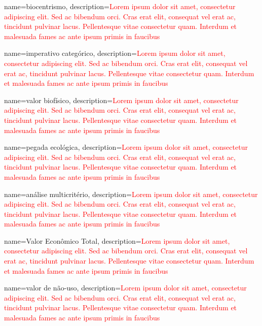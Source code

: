 {
	name=biocentrismo,
	description={\textcolor{red}{Lorem ipsum dolor sit amet, consectetur adipiscing elit. Sed ac bibendum orci. Cras erat elit, consequat vel erat ac, tincidunt pulvinar lacus. Pellentesque vitae consectetur quam. Interdum et malesuada fames ac ante ipsum primis in faucibus}}
}

{
	name=imperativo categórico,
	description={\textcolor{red}{Lorem ipsum dolor sit amet, consectetur adipiscing elit. Sed ac bibendum orci. Cras erat elit, consequat vel erat ac, tincidunt pulvinar lacus. Pellentesque vitae consectetur quam. Interdum et malesuada fames ac ante ipsum primis in faucibus}}
}

{
	name=valor biofísico,
	description={\textcolor{red}{Lorem ipsum dolor sit amet, consectetur adipiscing elit. Sed ac bibendum orci. Cras erat elit, consequat vel erat ac, tincidunt pulvinar lacus. Pellentesque vitae consectetur quam. Interdum et malesuada fames ac ante ipsum primis in faucibus}}
}

{
	name=pegada ecológica,
	description={\textcolor{red}{Lorem ipsum dolor sit amet, consectetur adipiscing elit. Sed ac bibendum orci. Cras erat elit, consequat vel erat ac, tincidunt pulvinar lacus. Pellentesque vitae consectetur quam. Interdum et malesuada fames ac ante ipsum primis in faucibus}}
}

{
	name=análise multicritério,
	description={\textcolor{red}{Lorem ipsum dolor sit amet, consectetur adipiscing elit. Sed ac bibendum orci. Cras erat elit, consequat vel erat ac, tincidunt pulvinar lacus. Pellentesque vitae consectetur quam. Interdum et malesuada fames ac ante ipsum primis in faucibus}}
}

{
	name=Valor Econômico Total,
	description={\textcolor{red}{Lorem ipsum dolor sit amet, consectetur adipiscing elit. Sed ac bibendum orci. Cras erat elit, consequat vel erat ac, tincidunt pulvinar lacus. Pellentesque vitae consectetur quam. Interdum et malesuada fames ac ante ipsum primis in faucibus}}
}

{
	name=valor de não-uso,
	description={\textcolor{red}{Lorem ipsum dolor sit amet, consectetur adipiscing elit. Sed ac bibendum orci. Cras erat elit, consequat vel erat ac, tincidunt pulvinar lacus. Pellentesque vitae consectetur quam. Interdum et malesuada fames ac ante ipsum primis in faucibus}}
}

